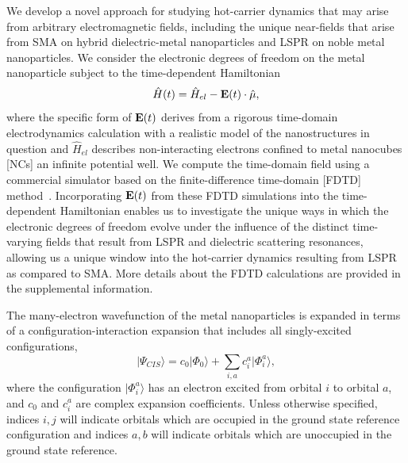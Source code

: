 \documentclass[journal=jpclcd,manuscript=letter]{achemso}
\begin{document}
We develop a novel approach for studying hot-carrier dynamics that may arise from arbitrary electromagnetic
fields, including the unique near-fields that arise from SMA on hybrid dielectric-metal nanoparticles and LSPR
on noble metal nanoparticles.
We consider the electronic degrees of freedom on the metal nanoparticle subject to the time-dependent Hamiltonian 
\begin{equation}\label{eq:TDHam}
\hat{H}(t) = \hat{H}_{el} - {\bf E}(t) \cdot \hat{\mu}, 
\end{equation}
where the specific form of ${\bf E}(t)$ derives from a rigorous time-domain electrodynamics calculation with a realistic model
of the nanostructures in question and $\hat{H}_{el}$ describes non-interacting electrons confined to metal nanocubes [NCs] an infinite potential well.  
We compute the time-domain field 
using a commercial simulator based on the finite-difference time-domain [FDTD] method~\cite{Lumerical}.  
Incorporating  ${\bf E}(t)$ from these FDTD simulations into the time-dependent Hamiltonian enables us to investigate the unique ways
in which the electronic degrees of freedom evolve under the influence of the distinct time-varying fields that result
from LSPR and dielectric scattering resonances, allowing us a unique window into the hot-carrier dynamics resulting from LSPR as compared
to SMA.  More details about the FDTD calculations are provided in
the supplemental information.  

The many-electron wavefunction of the metal nanoparticles is expanded in terms of a configuration-interaction expansion that
includes all singly-excited configurations,
\begin{equation}\label{eq:CIS}
|\Psi_{CIS}\rangle = c_0 |\Phi_0 \rangle + \sum_{i,a} c_i^a |\Phi_i^a\rangle,
\end{equation}
where the configuration $|\Phi_i^a\rangle$ has an electron excited from orbital $i$ to orbital $a$, 
and $c_0$ and $c_i^a$ are complex expansion coefficients.  Unless otherwise specified, indices $i, j$ will indicate
orbitals which are occupied in the ground state reference configuration and indices $a, b$ will indicate orbitals
which are unoccupied in the ground state reference.  
\end{document}
